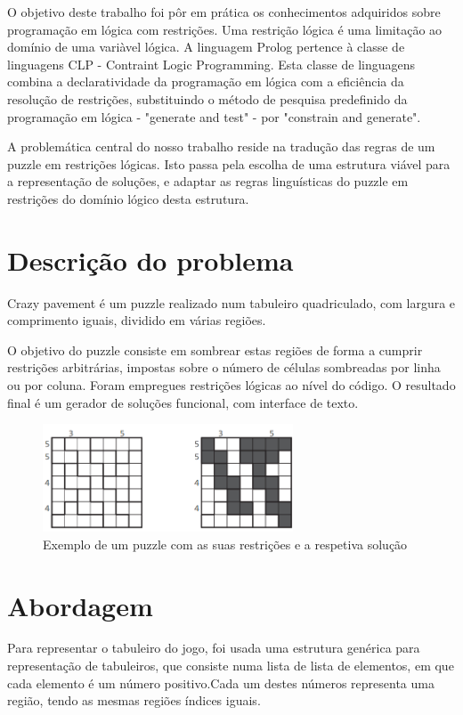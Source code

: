\documentclass[runningheads,a4paper]{llncs}
\begin{document}
O objetivo deste trabalho foi pôr em prática os conhecimentos adquiridos sobre programação em lógica com restrições. Uma restrição lógica é uma limitação ao domínio de uma variàvel lógica. A linguagem Prolog pertence à classe de linguagens CLP - Contraint Logic Programming. Esta classe de linguagens combina a declaratividade da programação em lógica com a eficiência da resolução de restrições, substituindo o método de pesquisa predefinido da programação em lógica - "generate and test" - por "constrain and generate".

A problemática central do nosso trabalho reside na tradução das regras de um puzzle em restrições lógicas. Isto passa pela escolha de uma estrutura viável para a representação de soluções, e adaptar as regras linguísticas do puzzle em restrições do domínio lógico desta estrutura.

\section{Descrição do problema}

Crazy pavement é um puzzle realizado num tabuleiro quadriculado, com largura e comprimento iguais, dividido em várias regiões.

O objetivo do puzzle consiste em sombrear estas regiões de forma a cumprir restrições arbitrárias, impostas sobre o número de células sombreadas por linha ou por coluna. 
Foram empregues restrições lógicas ao nível do código. O resultado final é um gerador de soluções funcional, com interface de texto.
 
\begin{figure} 
\centering
\includegraphics[height=3.2cm]{exemplo1.png}
\caption{Exemplo de um puzzle com as suas restrições e a respetiva solução} 
\label{fig:crazypavementexandsol}
\end{figure}

\newpage

\section{Abordagem}

Para representar o tabuleiro do jogo, foi usada uma estrutura genérica para representação de tabuleiros, que consiste numa lista de lista de elementos, em que cada elemento é um número positivo.Cada um destes números representa uma região, tendo as mesmas regiões índices iguais.
\end{document}
